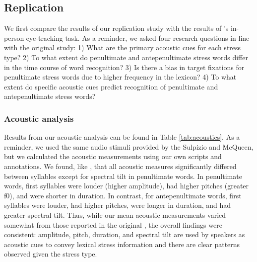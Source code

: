 \subsection{Replication}

We first compare the results of our replication study with the results of \cite{Sulpizio_McQueen_2012}'s in-person eye-tracking task. As a reminder, we asked four research questions in line with the original study: 1) What are the primary acoustic cues for each stress type? 2) To what extent do penultimate and antepenultimate stress words differ in the time course of word recognition? 3) Is there a bias in target fixations for penultimate stress words due to higher frequency in the lexicon? 4) To what extent do specific acoustic cues predict recognition of penultimate and antepenultimate stress words?  

\subsubsection{Acoustic analysis}
Results from our acoustic analysis can be found in Table \ref{tab:acoustics}. As a reminder, we used the same audio stimuli provided by the Sulpizio and McQueen, but we calculated the acoustic measurements using our own scripts and annotations. We found, like \cite{Sulpizio_McQueen_2012}, that all acoustic measures significantly differed between syllables except for spectral tilt in penultimate words. In penultimate words, first syllables were louder (higher amplitude), had higher pitches (greater f0), and were shorter in duration. In contrast, for antepenultimate words, first syllables were louder, had higher pitches, were longer in duration, and had greater spectral tilt. Thus, while our mean acoustic measurements varied somewhat from those reported in the original \cite{Sulpizio_McQueen_2012}, the overall findings were consistent: amplitude, pitch, duration, and spectral tilt are used by speakers as acoustic cues to convey lexical stress information and there are clear patterns observed given the stress type. 


